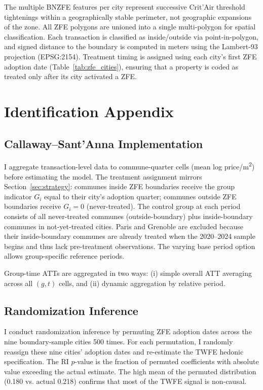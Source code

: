 \documentclass[12pt]{article}
\begin{document}
The multiple BNZFE features per city represent successive Crit'Air threshold tightenings within a geographically stable perimeter, not geographic expansions of the zone. All ZFE polygons are unioned into a single multi-polygon for spatial classification. Each transaction is classified as inside/outside via point-in-polygon, and signed distance to the boundary is computed in meters using the Lambert-93 projection (EPSG:2154). Treatment timing is assigned using each city's first ZFE adoption date (Table~\ref{tab:zfe_cities}), ensuring that a property is coded as treated only after its city activated a ZFE.

\section{Identification Appendix}

\subsection{Callaway--Sant'Anna Implementation}

I aggregate transaction-level data to commune-quarter cells (mean log price/m\textsuperscript{2}) before estimating the \citet{callaway2021difference} model. The treatment assignment mirrors Section~\ref{sec:strategy}: communes inside ZFE boundaries receive the group indicator $G_i$ equal to their city's adoption quarter; communes outside ZFE boundaries receive $G_i = 0$ (never-treated). The control group at each period consists of all never-treated communes (outside-boundary) plus inside-boundary communes in not-yet-treated cities. Paris and Grenoble are excluded because their inside-boundary communes are already treated when the 2020--2024 sample begins and thus lack pre-treatment observations. The varying base period option allows group-specific reference periods.

Group-time ATTs are aggregated in two ways: (i) simple overall ATT averaging across all $(g,t)$ cells, and (ii) dynamic aggregation by relative period.

\subsection{Randomization Inference}

I conduct randomization inference by permuting ZFE adoption dates across the nine boundary-sample cities 500 times. For each permutation, I randomly reassign these nine cities' adoption dates and re-estimate the TWFE hedonic specification. The RI $p$-value is the fraction of permuted coefficients with absolute value exceeding the actual estimate. The high mean of the permuted distribution (0.180 vs. actual 0.218) confirms that most of the TWFE signal is non-causal.
\end{document}
